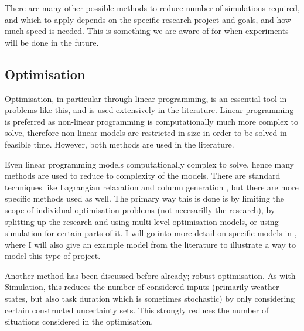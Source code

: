 \documentclass[a4paper,12pt]{article}
\begin{document}
There are many other possible methods to reduce number of simulations required, and which to apply depends on the specific research project and goals, and how much speed is needed. This is something we are aware of for when experiments will be done in the future. 

\bigskip

\subsection{Optimisation} \label{ss:opt}
Optimisation, in particular through linear programming, is an essential tool in problems like this, and is used extensively in the literature. Linear programming is preferred as non-linear programming is computationally much more complex to solve, therefore non-linear models are restricted in size in order to be solved in feasible time. However, both methods are used in the literature.

Even linear programming models computationally complex to solve, hence many methods are used to reduce to complexity of the models. There are standard techniques like Lagrangian relaxation \cite{fisher1981lagrangian} and column generation \cite{barnhart1998branch}, but there are more specific methods used as well. The primary way this is done is by limiting the scope of individual optimisation problems (not necesarilly the research), by splitting up the research and using multi-level optimisation models, or using simulation for certain parts of it. I will go into more detail on specific models in , where I will also give an example model from the literature to illustrate a way to model this type of project.


Another method has been discussed before already; robust optimisation. As with Simulation, this reduces the number of considered inputs (primarily weather states, but also task duration which is sometimes stochastic) by only considering certain constructed uncertainty sets. This strongly reduces the number of situations considered in the optimisation. 

\bigskip
\end{document}
